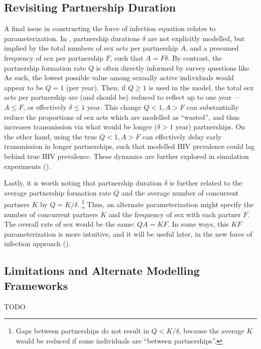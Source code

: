 \subsection{Revisiting Partnership Duration}\label{foi.prior.dur}
A final issue in constructing the force of infection equation relates to parameterization.
In , partnership durations $\delta$ are not explicitly modelled,
but implied by the total numbers of sex acts per partnership $A$,
and a presumed frequency of sex per partnership $F$, such that $A = F\delta$.
By contrast, the partnership formation rate $Q$ is often directly informed by survey questions like
As such, the lowest possible value among sexually active individuals
would appear to be $Q = 1$ (per year).
Then, if $Q \ge 1$ is used in the model,
the total sex acts per partnership are (and should be) reduced to reflect up to one year
--- \ie $A \le F$, or effectively $\delta \le 1$ year.
This change \vs $Q < 1, A > F$
can substantially reduce the proportions of sex acts which are modelled as ``wasted'',
and thus increases transmission via what would be longer ($\delta > 1$ year) partnerships.
On the other hand, using the true $Q < 1, A > F$
can effectively delay early transmission in longer partnerships,
such that modelled HIV prevalence could lag behind true HIV prevalence.
These dynamics are further explored in simulation experiments ().
\par
Lastly, it is worth noting that partnership duration $\delta$ is further related to
the average partnership formation rate $Q$ and
the average number of concurrent partners $K$ by $Q = K/\delta$.%
\footnote{Gaps between partnerships do not result in $Q < K/\delta$,
  because the average $K$ would be reduced if some individuals are ``between partnerships''.}
Thus, an alternate parameterization might specify
the number of concurrent partners $K$ and the frequency of sex with each partner $F$.
The overall rate of sex would be the same: $QA = KF$.
In some ways, this $KF$ parameterization is more intuitive,
and it will be useful later, in the new force of infection approach ().
\subsection{Limitations and Alternate Modelling Frameworks}\label{foi.prior.lims}
TODO